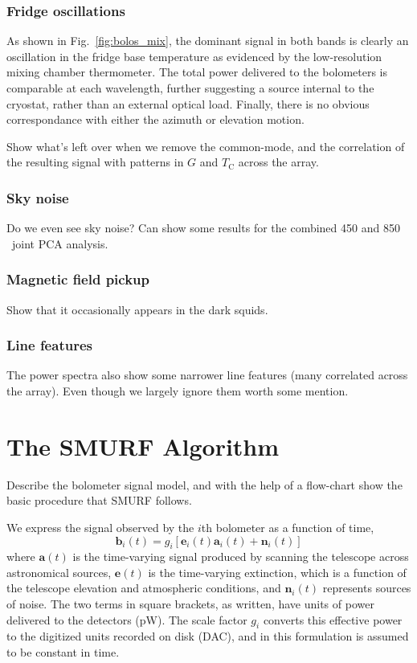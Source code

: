 \documentclass[useAMS,usenatbib,nofootinbib]{mn2e}
\begin{document}
\subsubsection{Fridge oscillations}
As shown in Fig.~\ref{fig:bolos_mix}, the dominant signal in both
bands is clearly an oscillation in the fridge base temperature as
evidenced by the low-resolution mixing chamber thermometer. The total
power delivered to the bolometers is comparable at each wavelength,
further suggesting a source internal to the cryostat, rather than an
external optical load. Finally, there is no obvious correspondance
with either the azimuth or elevation motion.

Show what's left over when we remove the common-mode, and the
correlation of the resulting signal with patterns in $G$ and
$T_\mathrm{C}$ across the array.

\subsubsection{Sky noise}
Do we even see sky noise? Can show some results for the combined 450
and 850\,\micron\ joint PCA analysis.

\subsubsection{Magnetic field pickup}
Show that it occasionally appears in the dark squids.

\subsubsection{Line features}

The power spectra also show some narrower line features (many
correlated across the array). Even though we largely ignore them worth
some mention.

\section{The SMURF Algorithm}
\label{sec:algorithm}

Describe the bolometer signal model, and with the help of a flow-chart
show the basic procedure that SMURF follows.

We express the signal observed by the $i$th bolometer as a function of time,
\begin{equation}
\mathbf{b}_i(t) = g_i[\mathbf{e}_i(t) \mathbf{a}_i(t) + \mathbf{n}_i(t)]
\end{equation}
where $\mathbf{a}(t)$ is the time-varying signal produced by scanning
the telescope across astronomical sources, $\mathbf{e}(t)$ is the
time-varying extinction, which is a function of the telescope
elevation and atmospheric conditions, and $\mathbf{n}_i(t)$ represents
sources of noise. The two terms in square brackets, as written, have
units of power delivered to the detectors (pW). The scale factor $g_i$
converts this effective power to the digitized units recorded on disk
(DAC), and in this formulation is assumed to be constant in time.
\end{document}
